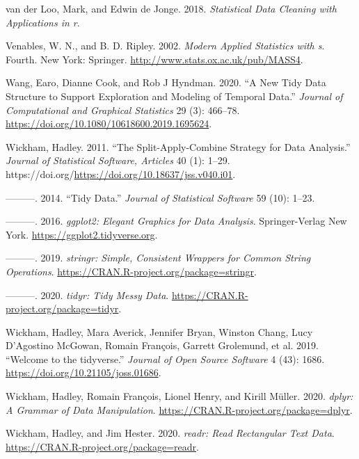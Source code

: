 \documentclass[12pt]{article}
\newlength{\cslhangindent}
\newlength{\cslentryspacingunit} %
\newenvironment{CSLReferences}[2] %
 {%
  \setlength{\parindent}{0pt}
  \ifodd #1
  \let\oldpar\par
  \def\par{\hangindent=\cslhangindent\oldpar}
  \fi
  \setlength{\parskip}{#2\cslentryspacingunit}
 }%
 {}
\begin{document}
\begin{CSLReferences}{1}{0}
\leavevmode{}%
van der Loo, Mark, and Edwin de Jonge. 2018. \emph{Statistical Data Cleaning with Applications in r}.

\leavevmode{}%
Venables, W. N., and B. D. Ripley. 2002. \emph{Modern Applied Statistics with s}. Fourth. New York: Springer. \url{http://www.stats.ox.ac.uk/pub/MASS4}.

\leavevmode{}%
Wang, Earo, Dianne Cook, and Rob J Hyndman. 2020. {``A New Tidy Data Structure to Support Exploration and Modeling of Temporal Data.''} \emph{Journal of Computational and Graphical Statistics} 29 (3): 466--78. \url{https://doi.org/10.1080/10618600.2019.1695624}.

\leavevmode{}%
Wickham, Hadley. 2011. {``The Split-Apply-Combine Strategy for Data Analysis.''} \emph{Journal of Statistical Software, Articles} 40 (1): 1--29. https://doi.org/\url{https://doi.org/10.18637/jss.v040.i01}.

\leavevmode{}%
---------. 2014. {``Tidy Data.''} \emph{Journal of Statistical Software} 59 (10): 1--23.

\leavevmode{}%
---------. 2016. \emph{{ggplot2: Elegant Graphics for Data Analysis}}. Springer-Verlag New York. \url{https://ggplot2.tidyverse.org}.

\leavevmode{}%
---------. 2019. \emph{{stringr: Simple, Consistent Wrappers for Common String Operations}}. \url{https://CRAN.R-project.org/package=stringr}.

\leavevmode{}%
---------. 2020. \emph{{tidyr: Tidy Messy Data}}. \url{https://CRAN.R-project.org/package=tidyr}.

\leavevmode{}%
Wickham, Hadley, Mara Averick, Jennifer Bryan, Winston Chang, Lucy D'Agostino McGowan, Romain François, Garrett Grolemund, et al. 2019. {``Welcome to the {tidyverse}.''} \emph{Journal of Open Source Software} 4 (43): 1686. \url{https://doi.org/10.21105/joss.01686}.

\leavevmode{}%
Wickham, Hadley, Romain François, Lionel Henry, and Kirill Müller. 2020. \emph{{dplyr: A Grammar of Data Manipulation}}. \url{https://CRAN.R-project.org/package=dplyr}.

\leavevmode{}%
Wickham, Hadley, and Jim Hester. 2020. \emph{{readr: Read Rectangular Text Data}}. \url{https://CRAN.R-project.org/package=readr}.


\end{CSLReferences}
\end{document}
